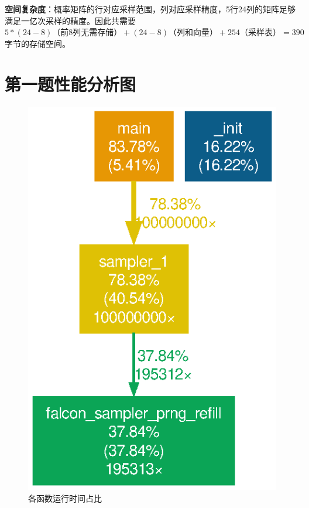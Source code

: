 \documentclass{article}
\begin{document}
	\textbf{空间复杂度}：概率矩阵的行对应采样范围，列对应采样精度，5行24列的矩阵足够满足一亿次采样的精度。因此共需要$5 * (24-8)\mbox{（前8列无需存储）} + (24-8)\mbox{（列和向量）} + 254\mbox{（采样表）} = 390$字节的存储空间。
	
	
	\appendix
	\newpage
	\section{第一题性能分析图}
	\begin{figure}[htb]
		\centering
		\includegraphics[width=.6\textwidth]{../gprof_figs/sampler_1.eps}
		\caption{各函数运行时间占比}
	\end{figure}
\end{document}
